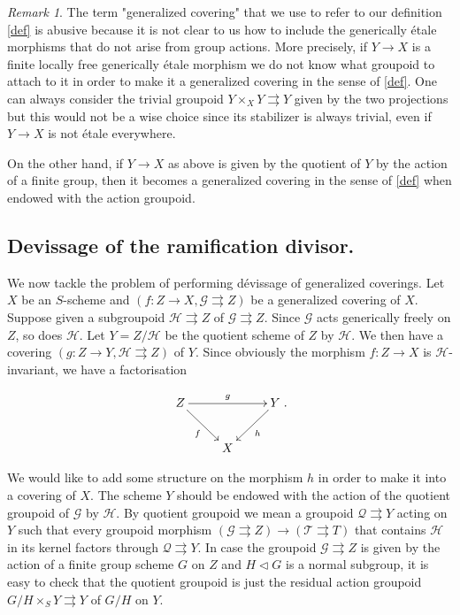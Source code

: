 \documentclass{amsart}
\theoremstyle{definition}
\theoremstyle{remark}
\newtheorem*{rema}{Remark}
\begin{document}
\begin{rema}

The term "generalized covering" that we use to refer to our definition \ref{def} is abusive because it is not clear to us how to include the generically \'etale morphisms that do not arise from group actions. More precisely, if $Y {\longrightarrow} X$ is a finite locally free generically \'etale morphism we do not know what groupoid to attach to it in order to make it a generalized covering in the sense of \ref{def}. One can always consider the trivial groupoid $Y \times_X Y {\rightrightarrows} Y$ given by the two projections but this would not be a wise choice since its stabilizer is always trivial, even if $Y {\longrightarrow} X$ is not \'etale everywhere.  

On the other hand, if $Y {\longrightarrow} X$ as above is given by the quotient of $Y$ by the action of a finite group, then it becomes a generalized covering  in the sense of \ref{def} when endowed with the action groupoid.  

\end{rema}

\subsection{Devissage of the ramification divisor.}

We now tackle the problem of performing d\'evissage of generalized coverings. Let $X$ be an $S$-scheme and $(f : Z {\longrightarrow} X , {{\mathcal G}} {\rightrightarrows} Z)$ be a generalized covering of $X$. Suppose given a subgroupoid ${{\mathcal H}} {\rightrightarrows} Z$ of ${{\mathcal G}} {\rightrightarrows} Z$. Since ${{\mathcal G}}$ acts generically freely on $Z$, so does ${{\mathcal H}}$. Let $Y = Z/{{\mathcal H}}$ be the quotient scheme of $Z$ by ${{\mathcal H}}$. We then have a covering $(g : Z {\longrightarrow} Y ,{{\mathcal H}} {\rightrightarrows} Z)$ of $Y$. Since obviously the morphism $f : Z {\longrightarrow} X$ is ${{\mathcal H}}$-invariant, we have a factorisation  

\[ \xymatrix{ Z \ar[rr]^g \ar[rd]_f && Y \ar[ld]^h \\ & X } .\]

We would like to add some structure on the morphism $h$ in order to make it into a covering of $X$.
The scheme $Y$ should be endowed with the action of the quotient groupoid of ${{\mathcal G}}$ by ${{\mathcal H}}$. By quotient groupoid we mean a groupoid ${{\mathcal Q}} {\rightrightarrows}  Y$ acting on $Y$ such that every groupoid morphism $({{\mathcal G}} {\rightrightarrows} Z) {\longrightarrow} ({{\mathcal T}} {\rightrightarrows} T)$ that contains ${{\mathcal H}}$ in its kernel factors through ${{\mathcal Q}} {\rightrightarrows} Y$. In case the groupoid ${{\mathcal G}} {\rightrightarrows} Z$ is given by the action of a finite group scheme $G$ on $Z$ and $H \lhd G$ is a normal subgroup, it is easy to check that the quotient groupoid is just the residual action groupoid $G/H \times_S Y {\rightrightarrows} Y$ of $G/H$ on $Y$. 
\end{document}
